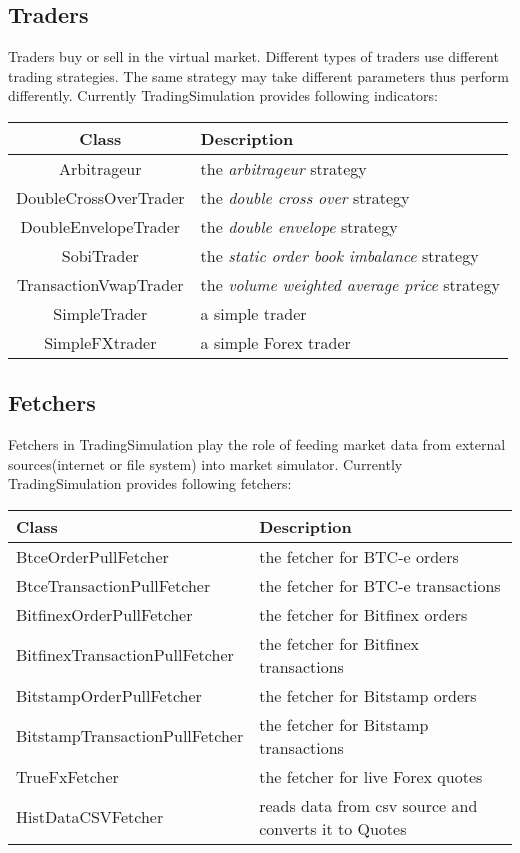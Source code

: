 \subsection{Traders}

Traders buy or sell in the virtual market. Different types of traders use different trading strategies. The same strategy may take different parameters thus perform differently. Currently TradingSimulation provides following indicators:\\

\noindent
\begin{tabularx}{\textwidth}{|c|X|}
  \hline
  Class & Description  \\
  \hline
  Arbitrageur & the \emph{arbitrageur} strategy \\
  \hline
  DoubleCrossOverTrader & the \emph{double cross over} strategy  \\
  \hline
  DoubleEnvelopeTrader & the \emph{double envelope} strategy  \\
  \hline
  SobiTrader & the \emph{static order book imbalance} strategy  \\
  \hline
  TransactionVwapTrader & the \emph{volume weighted average price} strategy  \\
  \hline
  SimpleTrader & a simple trader \\
  \hline
  SimpleFXtrader & a simple Forex trader \\
  \hline
\end{tabularx}

\subsection{Fetchers}

Fetchers in TradingSimulation play the role of feeding market data from external sources(internet or file system) into market simulator. Currently TradingSimulation provides following fetchers:\\

\noindent
\begin{tabularx}{\textwidth}{|l|X|}
  \hline
  Class & Description  \\
  \hline
  BtceOrderPullFetcher & the fetcher for BTC-e orders \\
  \hline
  BtceTransactionPullFetcher  & the fetcher for BTC-e transactions  \\
  \hline
  BitfinexOrderPullFetcher & the fetcher for Bitfinex orders  \\
  \hline
  BitfinexTransactionPullFetcher & the fetcher for Bitfinex transactions  \\
  \hline
  BitstampOrderPullFetcher & the fetcher for Bitstamp orders  \\
  \hline
  BitstampTransactionPullFetcher & the fetcher for Bitstamp transactions \\
  \hline
  TrueFxFetcher & the fetcher for  live Forex quotes  \\
  \hline
  HistDataCSVFetcher & reads data from csv source and converts it to Quotes \\
  \hline
\end{tabularx}\\[0.3cm]

